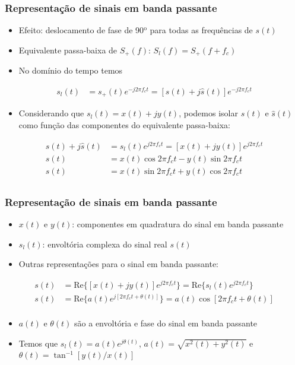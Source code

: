 \begin{frame}
	\frametitle{Representação de sinais em banda passante}

	\begin{itemize}
	 \item Efeito: deslocamento de fase de 90$^\mathrm{o}$ para todas as frequências de $s(t)$
	  \item Equivalente passa-baixa de $S_+(f)$: $S_l(f) = S_+(f+f_c)$
	  \item No domínio do tempo temos
	\end{itemize}
	\begin{align*}
	      s_l(t) &= s_+(t) e^{-j2\pi f_c t} = [s(t) + j \hat{s}(t)]e^{-j2\pi f_c t}
	\end{align*}
	\begin{itemize}
	 \item Considerando que $s_l(t) = x(t) + jy(t)$, podemos isolar $s(t)$ e $\hat{s}(t)$ como função das componentes do equivalente passa-baixa:
	\end{itemize}
	\begin{align*}
	      s(t) + j \hat{s}(t) &= s_l(t) e^{j2\pi f_c t} = [x(t) + jy(t)] e^{j2\pi f_c t} \\
	      s(t) &= x(t) \cos 2\pi f_c t - y(t) \sin 2\pi f_c t \\
	      \hat{s}(t) &= x(t) \sin 2\pi f_c t + y(t) \cos 2\pi f_c t \\
	\end{align*}

\end{frame}

\begin{frame}
	\frametitle{Representação de sinais em banda passante}

	\begin{itemize}
	 \item $x(t)$ e $y(t)$: componentes em quadratura do sinal em banda passante
	  \item $s_l(t)$: envoltória complexa do sinal real $s(t)$
	  \item Outras representações para o sinal em banda passante:
	\end{itemize}
	\begin{align*}
	    s(t) &= \mathrm{Re}\{[x(t) + jy(t)]e^{j2\pi f_c t}\} = \mathrm{Re}\{s_l(t) e^{j2\pi f_c t}\} \\
	    s(t) &= \mathrm{Re}\{a(t) e^{j[2\pi f_c t + \theta(t)]}\} = a(t) \cos [ 2\pi f_c t + \theta(t) ] \\
	\end{align*}
	\begin{itemize}
	 \item $a(t)$ e $\theta(t)$ são a envoltória e fase do sinal em banda passante
	 \item Temos que $s_l(t) = a(t) e^{j\theta(t)}$, $a(t) = \sqrt{x^2(t) + y^2(t)}$ e $\theta(t) = \tan^{-1} [y(t)/x(t)]$
	\end{itemize}

\end{frame}

